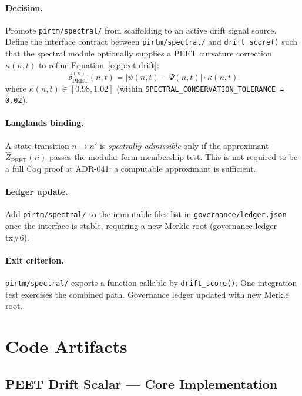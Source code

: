 \documentclass[11pt,letterpaper]{article}
\theoremstyle{definition}
\theoremstyle{remark}
\newcommand{\peet}{\mathrm{PEET}}
\begin{document}
\paragraph{Decision.}
Promote \texttt{pirtm/spectral/} from scaffolding to an active
drift signal source. Define the interface contract between
\texttt{pirtm/spectral/} and \texttt{drift\_score()} such that
the spectral module optionally supplies a PEET curvature correction
\(\kappa(n,t)\) to refine Equation~\eqref{eq:peet-drift}:
\begin{equation}
  \delta_{\peet}^{(\kappa)}(n,t) =
  \left| \psi(n,t) - \Psi(n,t) \right| \cdot \kappa(n,t)
  \label{eq:peet-drift-spectral}
\end{equation}
where \(\kappa(n,t) \in [0.98, 1.02]\) (within
\texttt{SPECTRAL\_CONSERVATION\_TOLERANCE = 0.02}).

\paragraph{Langlands binding.}
A state transition \(n \to n'\) is \emph{spectrally admissible}
only if the approximant \(\hat{Z}_{\peet}(n)\) passes the modular
form membership test. This is not required to be a full Coq proof
at ADR-041; a computable approximant is sufficient.

\paragraph{Ledger update.}
Add \texttt{pirtm/spectral/} to the immutable files list in
\texttt{governance/ledger.json} once the interface is stable,
requiring a new Merkle root (governance ledger tx\#6).

\paragraph{Exit criterion.}
\texttt{pirtm/spectral/} exports a function callable by
\texttt{drift\_score()}. One integration test exercises
the combined path. Governance ledger updated with new Merkle root.

\section{Code Artifacts}

\subsection{PEET Drift Scalar --- Core Implementation}
\end{document}
